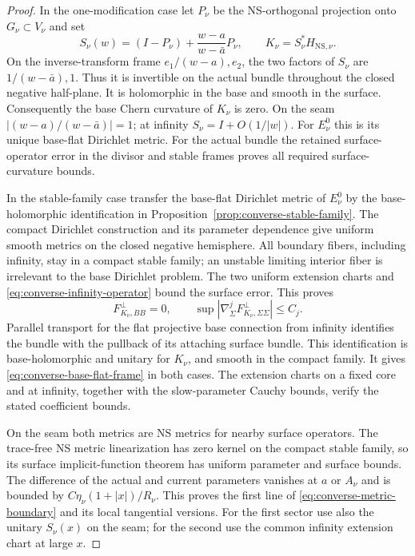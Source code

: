 \documentclass[11pt]{amsart}
\theoremstyle{definition}
\theoremstyle{remark}
\theoremstyle{plain}
\begin{document}
\begin{proof}
In the one-modification case let $P_\nu$ be the NS-orthogonal projection
onto $G_\nu\subset V_\nu$ and set
\begin{equation}\label{eq:converse-blaschke-metric}
 S_\nu(w)=(I-P_\nu)+\frac{w-a}{w-\bar a}P_\nu,\qquad
                      K_\nu=S_\nu^*H_{\mathrm{NS},\nu}.
\end{equation}
On the inverse-transform frame $e_1/(w-a),e_2$, the two factors
of $S_\nu$ are $1/(w-\bar a),1$. Thus it is invertible on the
actual bundle throughout the closed negative half-plane. It is
holomorphic in the base and smooth in the surface. Consequently
the base Chern curvature of $K_\nu$ is zero. On the seam
$|(w-a)/(w-\bar a)|=1$; at infinity $S_\nu=I+O(1/|w|)$.
For $E_\nu^0$ this is its unique base-flat Dirichlet metric.
For the actual bundle the retained surface-operator error in the
divisor and stable frames proves all required surface-curvature
bounds.

In the stable-family case transfer the base-flat Dirichlet metric
of $E_\nu^0$ by the base-holomorphic identification in
Proposition~\ref{prop:converse-stable-family}. The compact Dirichlet
construction and its parameter dependence give uniform smooth
metrics on the closed negative hemisphere. All boundary fibers,
including infinity, stay in a compact stable family; an unstable
limiting interior fiber is irrelevant to the base Dirichlet problem.
The two uniform extension charts and
\eqref{eq:converse-infinity-operator} bound the surface error.
This proves
\begin{equation}\label{eq:converse-reference-curvature}
 F_{K_\nu,BB}^{\perp}=0,\qquad
 \sup|\nabla_\Sigma^j F_{K_\nu,\Sigma\Sigma}^{\perp}|\leq C_j.
\end{equation}
Parallel transport for the flat projective base connection from
infinity identifies the bundle with the pullback of its attaching
surface bundle. This identification is base-holomorphic and unitary
for $K_\nu$, and smooth in the compact family. It gives
\eqref{eq:converse-base-flat-frame} in both cases.
The extension charts on a fixed core and at infinity, together with
the slow-parameter Cauchy bounds, verify the stated coefficient bounds.

On the seam both metrics are NS metrics for nearby surface operators.
The trace-free NS metric linearization has zero kernel on the compact
stable family, so its surface implicit-function theorem has uniform
parameter and surface bounds. The difference of the actual and current
parameters vanishes at $a$ or $A_\nu$ and is bounded by
$C\eta_\nu(1+|x|)/R_\nu$. This proves the first line of
\eqref{eq:converse-metric-boundary} and its local tangential versions.
For the first sector use also the unitary $S_\nu(x)$ on the seam;
for the second use the common infinity extension chart at large $x$.


\end{proof}
\end{document}
